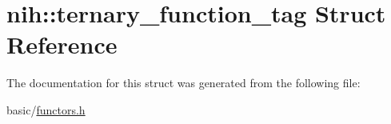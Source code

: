 \hypertarget{structnih_1_1ternary__function__tag}{
\section{nih\-:\-:ternary\-\_\-function\-\_\-tag \-Struct \-Reference}
\label{structnih_1_1ternary__function__tag}
}


\-The documentation for this struct was generated from the following file\-:\begin{DoxyCompactItemize}
\item 
basic/\hyperlink{functors_8h}{functors.\-h}\end{DoxyCompactItemize}
